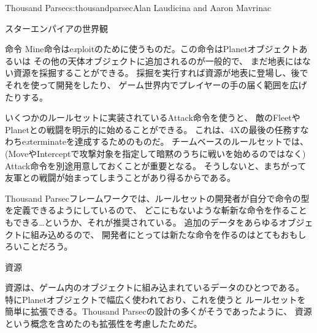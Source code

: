 \begin{aosachapter}{Thousand Parsec}{s:thousandparsec}{Alan Laudicina and Aaron Mavrinac}
\begin{aosasect1}{スターエンパイアの世界観}
\begin{aosasect2}{命令}
Mine命令はe\emph{x}ploitのために使うものだ。この命令はPlanetオブジェクトあるいは
その他の天体オブジェクトに追加されるのが一般的で、
まだ地表にはない資源を採掘することができる。
採掘を実行すれば資源が地表に登場し、後でそれを使って開発をしたり、
ゲーム世界内でプレイヤーの手の届く範囲を広げたりする。

いくつかのルールセットに実装されているAttack命令を使うと、
敵のFleetやPlanetとの戦闘を明示的に始めることができる。
これは、4Xの最後の任務すなわちe\emph{x}terminateを達成するためのものだ。
チームベースのルールセットでは、(MoveやInterceptで攻撃対象を指定して暗黙のうちに戦いを始めるのではなく)
Attack命令を別途用意しておくことが重要となる。
そうしないと、まちがって友軍との戦闘が始まってしまうことがあり得るからである。

Thousand Parsecフレームワークでは、ルールセットの開発者が自分で命令の型を定義できるようにしているので、
どこにもないような斬新な命令を作ることもできる…というか、それが推奨されている。
追加のデータをあらゆるオブジェクトに組み込めるので、
開発者にとっては新たな命令を作るのはとてもおもしろいことだろう。

\end{aosasect2}

\begin{aosasect2}{資源}

資源は、ゲーム内のオブジェクトに組み込まれているデータのひとつである。
特にPlanetオブジェクトで幅広く使われており、これを使うと
ルールセットを簡単に拡張できる。Thousand Parsecの設計の多くがそうであったように、
資源という概念を含めたのも拡張性を考慮したためだ。


\end{aosasect2}
\end{aosasect1}
\end{aosachapter}
